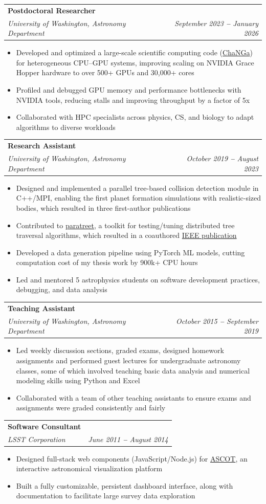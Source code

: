 \documentclass[letterpaper,11pt]{article}
\makeatletter
\newcommand{\resumeItem}[1]{
  \item\small{
    {#1 \vspace{-2pt}}
  }
}
\newcommand{\resumeSubheading}[4]{
  \vspace{-2pt}\item
    \begin{tabular*}{0.97\textwidth}[t]{l@{\extracolsep{\fill}}r}
      \textbf{#1} & #2 \\
      \textit{\small#3} & \textit{\small #4} \\
    \end{tabular*}\vspace{-7pt}
}
\newcommand{\resumeItemListStart}{\begin{itemize}}
\newcommand{\resumeItemListEnd}{\end{itemize}\vspace{-5pt}}
\makeatother
\begin{document}
    \resumeSubheading
      {Postdoctoral Researcher}{}
      {University of Washington, Astronomy Department}{September 2023 \textbf{--} January 2026}
        \resumeItemListStart
     \resumeItem{Developed and optimized a large-scale scientific computing code (\href{https://github.com/N-BodyShop/changa}{ChaNGa}) for heterogeneous CPU–GPU systems, improving scaling on NVIDIA Grace Hopper hardware to over 500+ GPUs and 30,000+ cores}
	   \resumeItem{Profiled and debugged GPU memory and performance bottlenecks with NVIDIA tools, reducing stalls and improving throughput by a factor of 5x}
	   \resumeItem{Collaborated with HPC specialists across physics, CS, and biology to adapt algorithms to diverse workloads}
        \resumeItemListEnd
        
     \resumeSubheading
      {Research Assistant}{}
      {University of Washington, Astronomy Department}{October 2019 \textbf{--} August 2023}
        \resumeItemListStart
     \resumeItem{Designed and implemented a parallel tree-based collision detection module in C++/MPI, enabling the first planet formation simulations with realistic-sized bodies, which resulted in three first-author publications}
	   \resumeItem{Contributed to \href{https://paratreet.github.io/}{paratreet}, a toolkit for testing/tuning distributed tree traversal algorithms, which resulted in a coauthored \href{https://doi.org/10.1109/IPDPS53621.2022.00079}{IEEE publication}}
	   \resumeItem{Developed a data generation pipeline using PyTorch ML models, cutting computation cost of my thesis work by 900k+ CPU hours}
	   \resumeItem{Led and mentored 5 astrophysics students on software development practices, debugging, and data analysis}
        \resumeItemListEnd
        
       \resumeSubheading
      {Teaching Assistant}{}
      {University of Washington, Astronomy Department}{October 2015 \textbf{--} September 2019}
        \resumeItemListStart
        \resumeItem{Led weekly discussion sections, graded exams, designed homework assignments and performed guest lectures for undergraduate astronomy classes, some of which involved teaching basic data analysis and numerical modeling skills using Python and Excel}
	      \resumeItem{Collaborated with a team of other teaching assistants to ensure exams and assignments were graded consistently and fairly}
        \resumeItemListEnd
        
       \resumeSubheading
      {Software Consultant}{}
      {LSST Corporation}{June 2011 \textbf{--} August 2014}
        \resumeItemListStart
        \resumeItem{Designed full-stack web components (JavaScript/Node.js) for {\sc \href{https://ascot.github.io/}{ASCOT}}, an interactive astronomical visualization platform}
	      \resumeItem{Built a fully customizable, persistent dashboard interface, along with documentation to facilitate large survey data exploration}
        \resumeItemListEnd
        
\end{document}
